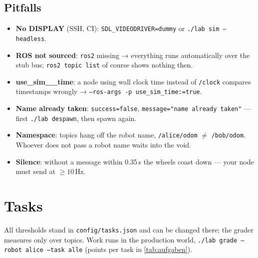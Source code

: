 \documentclass[12pt,a4paper]{scrartcl}
\newcommand{\thema}[1]{\texttt{#1}}
\newcommand{\ordner}[1]{\texttt{#1}}
\newcommand{\kommando}[1]{\texttt{#1}}
\begin{document}
\subsection{Pitfalls}
\begin{itemize}
  \item \textbf{No DISPLAY} (SSH, CI): \kommando{SDL\_VIDEODRIVER=dummy} or
        \kommando{./lab sim --headless}.
  \item \textbf{ROS not sourced}: \kommando{ros2} missing → everything runs automatically
        over the stub bus; \thema{ros2 topic list} of course shows nothing then.
  \item \textbf{use\_sim\_\_time}: a node using wall clock time instead of \thema{/clock}
        compares timestamps wrongly → \kommando{--ros-args -p use\_sim\_time:=true}.
  \item \textbf{Name already taken}: \thema{success=false},
        \thema{message="name already taken"} — first \kommando{./lab despawn}, then spawn again.
  \item \textbf{Namespace}: topics hang off the robot name, \thema{/alice/odom} $\neq$
        \thema{/bob/odom}. Whoever does not pass a robot name waits into the void.
  \item \textbf{Silence}: without a message within 0.35\,s the wheels coast down —
        your node must send at \(\ge 10\,\mathrm{Hz}\).
\end{itemize}

\section{Tasks}\label{sec:aufgaben}
All thresholds stand in \ordner{config/tasks.json} and can be changed there; the
grader measures only over topics. Work runs in the production world,
\kommando{./lab grade --robot alice --task alle} (points per task in
\cref{tab:aufgaben}).
\end{document}
